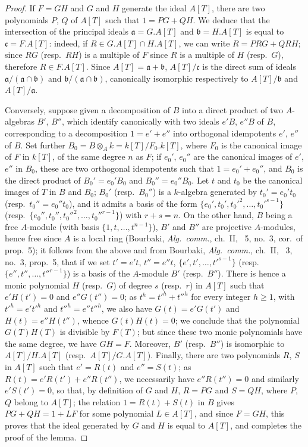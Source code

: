 \begin{proof}
If $F=GH$ and $G$ and $H$ generate the ideal $A[T]$, there are two polynomials $P$, $Q$ of $A[T]$ such that $1=PG+QH$.
We deduce that the intersection of the principal ideals $\mathfrak{a}=G.A[T]$ and $\mathfrak{b}=H.A[T]$ is equal to $\mathfrak{c}=F.A[T]$:
indeed, if $R\in G.A[T]\cap H.A[T]$, we can write $R=PRG+QRH$;
since $RG$ (resp.\ $RH$) is a multiple of $F$ since $R$ is a multiple of $H$ (resp.\ $G$), therefore $R\in F.A[T]$.
Since $A[T]=\mathfrak{a}+\mathfrak{b}$, $A[T]/\mathfrak{c}$ is the direct sum of ideals $\mathfrak{a}/(\mathfrak{a}\cap\mathfrak{b})$ and $\mathfrak{b}/(\mathfrak{a}\cap\mathfrak{b})$, canonically isomorphic respectively to $A[T]/\mathfrak{b}$ and $A[T]/\mathfrak{a}$.

Conversely, suppose given a decomposition of $B$ into a direct product of two $A$-algebras $B'$, $B''$, which identify canonically with two ideals $e'B$, $e''B$ of $B$, corresponding to a decomposition $1=e'+e''$ into orthogonal idempotents $e'$, $e''$ of $B$.
Set further $B_0=B\otimes_A k=k[T]/F_0.k[T]$, where $F_0$ is the canonical image of $F$ in $k[T]$, of the same degree $n$ as $F$;
if $e_0'$, $e_0''$ are the canonical images of $e'$, $e''$ in $B_0$, these are two orthogonal idempotents such that $1=e_0'+e_0''$, and $B_0$ is the direct product of $B_0'=e_0'B_0$ and $B_0''=e_0''B_0$.
Let $t$ and $t_0$ be the canonical images of $T$ in $B$ and $B_0$;
$B_0'$ (resp.\ $B_0''$) is a $k$-algebra generated by $t_0'=e_0't_0$ (resp.\ $t_0''=e_0''t_0$), and it admits a basis of the form $\{e_0',t_0',t_0'^2,\ldots,t_0'^{s-1}\}$ (resp.\ $\{e_0'',t_0'',t_0''^2,\ldots,t_0''^{r-1}\}$) with $r+s=n$.
On the other hand, $B$ being a free $A$-module (with basis $\{1,t,\ldots,t^{n-1}\}$), $B'$ and $B''$ are projective $A$-modules, hence free since $A$ is a local ring (Bourbaki, \emph{Alg.\ comm.}, ch.~II, \textsection~5, no.~3, cor.\ of prop.~5);
it follows from the above and from Bourbaki, \emph{Alg.\ comm.}, ch.~II, \textsection~3, no.~3, prop.~5, that if we set $t'=e't$, $t''=e''t$, $\{e',t',\ldots,t'^{s-1}\}$ (resp.\ $\{e'',t'',\ldots,t''^{r-1}\}$) is a basis of the $A$-module $B'$ (resp.\ $B''$).
There is hence a monic polynomial $H$ (resp.\ $G$) of degree $s$ (resp.\ $r$) in $A[T]$ such that $e'H(t')=0$ and $e''G(t'')=0$;
as $t^h=t'^h+t''^h$ for every integer $h\geq 1$, with $t'^h=e't'^h$ and $t''^h=e''t''^h$, we also have $G(t)=e'G(t')$ and $H(t)=e''H(t'')$, whence $G(t)H(t)=0$;
we conclude that the polynomial $G(T)H(T)$ is divisible by $F(T)$;
but since these two monic polynomials have the same degree, we have $GH=F$.
Moreover, $B'$ (resp.\ $B''$) is isomorphic to $A[T]/H.A[T]$ (resp.\ $A[T]/G.A[T]$).
Finally, there are two polynomials $R$, $S$ in $A[T]$ such that $e'=R(t)$ and $e''=S(t)$;
as $R(t)=e'R(t')+e''R(t'')$, we necessarily have $e''R(t'')=0$ and similarly $e'S(t')=0$, so that, by definition of $G$ and $H$, $R=PG$ and $S=QH$, where $P$, $Q$ belong to $A[T]$;
the relation $1=R(t)+S(t)$ in $B$ gives $PG+QH=1+LF$ for some polynomial $L\in A[T]$, and since $F=GH$, this proves that the ideal generated by $G$ and $H$ is equal to $A[T]$, and completes the proof of the lemma.
\end{proof}

